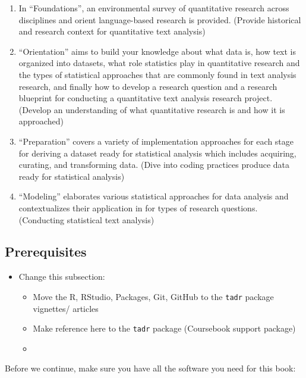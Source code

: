 \documentclass[
]{article}
\providecommand{\tightlist}{%
  \setlength{\itemsep}{0pt}\setlength{\parskip}{0pt}}
\newenvironment{rmdblock}[1]
  {\begin{shaded*}
  \begin{itemize}
  \renewcommand{\labelitemi}{
    \raisebox{-.5\height}[0pt][0pt]{
      {\setkeys{Gin}{width=2em,keepaspectratio}\texttt{[image: assets/images/\#1]}}
    }
  }
  \item
  }
  {
  \end{itemize}
  \end{shaded*}
  }
\newenvironment{rmdtodo}
  {\begin{rmdblock}{paper}}
  {\end{rmdblock}}
\begin{document}
\begin{enumerate}
\def\labelenumi{\arabic{enumi}.}
\tightlist
\item
  In ``Foundations'', an environmental survey of quantitative research across disciplines and orient language-based research is provided. (Provide historical and research context for quantitative text analysis)
\item
  ``Orientation'' aims to build your knowledge about what data is, how text is organized into datasets, what role statistics play in quantitative research and the types of statistical approaches that are commonly found in text analysis research, and finally how to develop a research question and a research blueprint for conducting a quantitative text analysis research project. (Develop an understanding of what quantitative research is and how it is approached)
\item
  ``Preparation'' covers a variety of implementation approaches for each stage for deriving a dataset ready for statistical analysis which includes acquiring, curating, and transforming data. (Dive into coding practices produce data ready for statistical analysis)
\item
  ``Modeling'' elaborates various statistical approaches for data analysis and contextualizes their application in for types of research questions. (Conducting statistical text analysis)
\end{enumerate}

\hypertarget{prerequisites}{%
\subsection{Prerequisites}\label{prerequisites}}

\begin{rmdtodo}
Change this subsection:

\begin{itemize}
\tightlist
\item
  Move the R, RStudio, Packages, Git, GitHub to the \texttt{tadr}
  package vignettes/ articles
\item
  Make reference here to the \texttt{tadr} package (Coursebook support
  package)
\item
\end{itemize}
\end{rmdtodo}

Before we continue, make sure you have all the software you need for this book:
\end{document}
